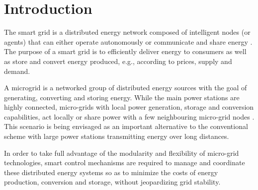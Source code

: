 \section{Introduction}

The smart grid is a distributed energy network composed of intelligent
nodes (or agents) that can either operate autonomously or communicate and share energy \cite{weiss1999multiagent}.
The purpose of a smart grid is to efficiently deliver energy to consumers as well as store and convert
energy produced, e.g., according to prices, supply and demand. 

A microgrid is a networked group of distributed energy sources with the goal of
generating, converting and storing energy. 
While the main power stations are highly connected, micro-grids with local power generation, storage
and conversion capabilities, act locally or share power with a few neighbouring micro-grid nodes \cite{farhangi2010path}.
This scenario is being envisaged as an important alternative to the conventional scheme with
large power stations transmitting energy over long distances.

 In order to take full advantage of the modularity and flexibility of micro-grid technologies, smart
control mechanisms are required to manage and coordinate these distributed energy systems so as to
minimize the costs of energy production, conversion and storage, without jeopardizing grid stability.

